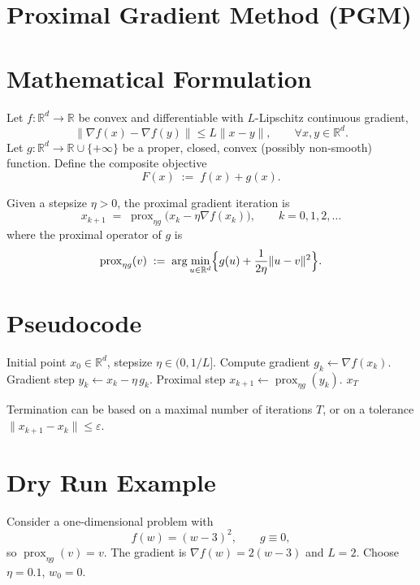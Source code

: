 \documentclass[11pt]{article}
\newcommand{\prox}{\operatorname{prox}}
\newcommand{\R}{\mathbb{R}}
\begin{document}
\section*{Proximal Gradient Method (PGM)}

\section*{Mathematical Formulation}
Let $f:\R^{d}\rightarrow\R$ be convex and differentiable with $L$-Lipschitz continuous gradient,
\[
\|\nabla f(x)-\nabla f(y)\|\le L\|x-y\|,\qquad\forall x,y\in\R^{d}.
\]
Let $g:\R^{d}\rightarrow\R\cup\{+\infty\}$ be a proper, closed, convex (possibly non‑smooth) function.
Define the composite objective
\[
F(x)\;:=\;f(x)+g(x).
\]

Given a stepsize $\eta>0$, the proximal gradient iteration is
\begin{equation}\label{eq:pgm}
x_{k+1}\;=\;\prox_{\eta g}\!\bigl(x_{k}-\eta\nabla f(x_{k})\bigr),
\qquad k=0,1,2,\dots
\end{equation}
where the proximal operator of $g$ is
\[
\prox_{\eta g}(v)\;:=\;\arg\min_{u\in\R^{d}}\Bigl\{ g(u)+\frac{1}{2\eta}\|u-v\|^{2}\Bigr\}.
\]

\section*{Pseudocode}
\begin{algorithm}[H]
\caption{Proximal Gradient Method}
\begin{algorithmic}[1]
\REQUIRE Initial point $x_{0}\in\R^{d}$, stepsize $\eta\in(0,1/L]$.
    \STATE Compute gradient $g_{k}\gets\nabla f(x_{k})$.
    \STATE Gradient step $y_{k}\gets x_{k}-\eta\, g_{k}$.
    \STATE Proximal step $x_{k+1}\gets \prox_{\eta g}(y_{k})$.
\ENDFOR
\RETURN $x_{T}$
\end{algorithmic}
\end{algorithm}
Termination can be based on a maximal number of iterations $T$, or on a tolerance
$\|x_{k+1}-x_{k}\|\le\varepsilon$.

\section*{Dry Run Example}
Consider a one‑dimensional problem with
\[
f(w)=(w-3)^{2},\qquad g\equiv0,
\]
so $\prox_{\eta g}(v)=v$.
The gradient is $\nabla f(w)=2(w-3)$ and $L=2$.
Choose $\eta=0.1$, $w_{0}=0$.
\end{document}
